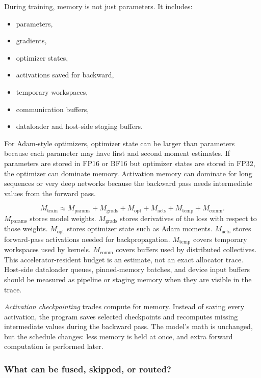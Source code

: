 During training, memory is not just parameters. It includes:

\begin{itemize}[leftmargin=*]
  \item parameters,
  \item gradients,
  \item optimizer states,
  \item activations saved for backward,
  \item temporary workspaces,
  \item communication buffers,
  \item dataloader and host-side staging buffers.
\end{itemize}

For Adam-style optimizers, optimizer state can be larger than parameters because each parameter may have first and second moment estimates. If parameters are stored in FP16 or BF16 but optimizer states are stored in FP32, the optimizer can dominate memory. Activation memory can dominate for long sequences or very deep networks because the backward pass needs intermediate values from the forward pass.

\begin{keyequation}
\[
  M_{\text{train}} \approx
  M_{\text{params}} +
  M_{\text{grads}} +
  M_{\text{opt}} +
  M_{\text{acts}} +
  M_{\text{temp}} +
  M_{\text{comm}}.
\]
\tcblower
\(M_{\text{params}}\) stores model weights. \(M_{\text{grads}}\) stores derivatives of the loss with respect to those weights. \(M_{\text{opt}}\) stores optimizer state such as Adam moments. \(M_{\text{acts}}\) stores forward-pass activations needed for backpropagation. \(M_{\text{temp}}\) covers temporary workspaces used by kernels. \(M_{\text{comm}}\) covers buffers used by distributed collectives. This accelerator-resident budget is an estimate, not an exact allocator trace. Host-side dataloader queues, pinned-memory batches, and device input buffers should be measured as pipeline or staging memory when they are visible in the trace.
\end{keyequation}

\emph{Activation checkpointing} trades compute for memory. Instead of saving every activation, the program saves selected checkpoints and recomputes missing intermediate values during the backward pass. The model's math is unchanged, but the schedule changes: less memory is held at once, and extra forward computation is performed later.

\subsubsection{What can be fused, skipped, or routed?}

